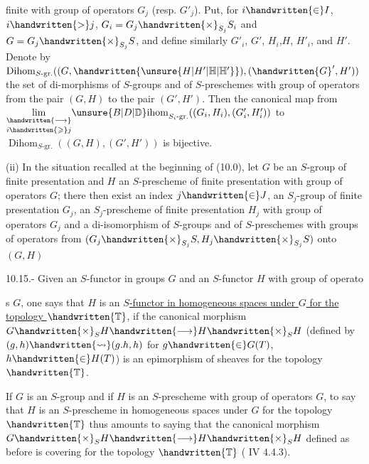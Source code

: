 finite with group of operators $G_j$ (resp. $G'_j$). Put, for $i\handwritten{\in}I$, $i\handwritten{>}j$, $G_i=G_j\handwritten{\times}_{S_j}S_i$ and $G=G_j\handwritten{\times}_{S_j}S$, and define similarly $G'_i$, $G'$, $H_i$,$H$, $H'_i$, and $H'$. Denote by $\operatorname{Dihom}_{S\text{-gr.}}((G,\handwritten{\unsure{H|H'|\mathbb{H}|\mathbb{H}'}}),(\handwritten{G}',H'))$ the set of di-morphisms of $S$-groups and of $S$-preschemes with group of operators from the pair $(G,H)$ to the pair $(G',H')$. Then the canonical map from $\underset{i\handwritten{\geqslant}j}{\underset{\handwritten{\longrightarrow}}{\lim}}{\unsure{B|D|\mathbb{D}}\mathrm{ihom}}_{S_i\text{-gr.}}((G_i,H_i),(G'_i,H'_i))$ to $\operatorname{Dihom}_{S\text{-gr.}}((G,H),(G',H'))$ is bijective.

(ii) In the situation recalled at the beginning of (10.0), let $G$ be an $S$-group  of finite presentation and $H$ an $S$-prescheme of finite presentation with group of operators $G$; there then exist an index $j\handwritten{\in}J$, an $S_j$-group of finite presentation $G_j$, an $S_j$-prescheme of finite presentation $H_j$ with group of operators $G_j$ and a di-isomorphism of $S$-groups and of $S$-preschemes with groups of operators from $(G_j\handwritten{\times}_{S_j}S,H_j\handwritten{\times}_{S_j}S)$ onto$(G,H)$

 10.15.- Given an $S$-functor in groups $G$ and an $S$-functor $H$ with group of operatos $G$, one says that $H$ is an \uline{$S$-functor in homogeneous spaces under $G$ for the topology $\handwritten{\mathbb{T}}$}, if the canonical morphism $G\handwritten{\times}_S H\handwritten{\longrightarrow}H\handwritten{\times}_S H$ (defined by $(g,h)\handwritten{\rightsquigarrow}(g.h,h)$ for $g\handwritten{\in}G(T)$, $h\handwritten{\in}H(T)$) is an epimorphism of sheaves for the topology $\handwritten{\mathbb{T}}$.

If $G$ is an $S$-group and if $H$ is an $S$-prescheme with  group of operators $G$, to say that $H$ is an $S$-prescheme in homogeneous spaces under $G$ for the topology $\handwritten{\mathbb{T}}$ thus amounts to saying that the canonical morphism $G\handwritten{\times}_S H\handwritten{\longrightarrow}H\handwritten{\times}_S H$ defined as before is covering for the topology $\handwritten{\mathbb{T}}$ ( IV 4.4.3).

